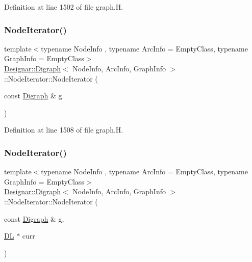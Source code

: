 Definition at line 1502 of file graph.\+H.

\mbox{\label{class_designar_1_1_digraph_1_1_node_iterator_aa54e560d151fad3a8e36c91dc4006ce4}} 
\subsubsection{\texorpdfstring{Node\+Iterator()}{NodeIterator()}\hspace{0.1cm}{\footnotesize\ttfamily [2/5]}}
{\footnotesize\ttfamily template$<$typename Node\+Info , typename Arc\+Info  = Empty\+Class, typename Graph\+Info  = Empty\+Class$>$ \\
\hyperlink{class_designar_1_1_digraph}{Designar\+::\+Digraph}$<$ Node\+Info, Arc\+Info, Graph\+Info $>$\+::Node\+Iterator\+::\+Node\+Iterator (\begin{DoxyParamCaption}\item[{const \hyperlink{class_designar_1_1_digraph}{Digraph} \&}]{g }\end{DoxyParamCaption})\hspace{0.3cm}{\ttfamily [inline]}}



Definition at line 1508 of file graph.\+H.

\mbox{\label{class_designar_1_1_digraph_1_1_node_iterator_a2a8d16402a7ec8ac1675cb2729bc4726}} 
\subsubsection{\texorpdfstring{Node\+Iterator()}{NodeIterator()}\hspace{0.1cm}{\footnotesize\ttfamily [3/5]}}
{\footnotesize\ttfamily template$<$typename Node\+Info , typename Arc\+Info  = Empty\+Class, typename Graph\+Info  = Empty\+Class$>$ \\
\hyperlink{class_designar_1_1_digraph}{Designar\+::\+Digraph}$<$ Node\+Info, Arc\+Info, Graph\+Info $>$\+::Node\+Iterator\+::\+Node\+Iterator (\begin{DoxyParamCaption}\item[{const \hyperlink{class_designar_1_1_digraph}{Digraph} \&}]{g,  }\item[{\hyperlink{class_designar_1_1_d_l}{DL} $\ast$}]{curr }\end{DoxyParamCaption})\hspace{0.3cm}{\ttfamily [inline]}}



